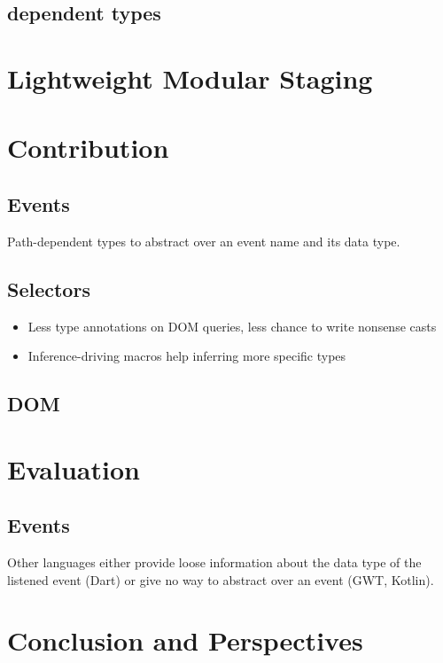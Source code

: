 \documentclass[runningheads,a4paper]{llncs}
\begin{document}
\subsection{dependent types}

\section{Lightweight Modular Staging}

\section{Contribution}

\subsection{Events}

Path-dependent types to abstract over an event name and its data type.

\subsection{Selectors}

\begin{itemize}
 \item Less type annotations on DOM queries, less chance to write nonsense casts
 \item Inference-driving macros help inferring more specific types
\end{itemize}

\subsection{DOM}


\section{Evaluation}

\subsection{Events}

Other languages either provide loose information about the data type of the listened event (Dart) or give no way to
abstract over an event (GWT, Kotlin).

\section{Conclusion and Perspectives}




\end{document}
